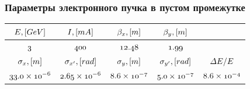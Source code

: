 \documentclass[14pt, hyperref = {colorlinks},xcolor=table ]{beamer}
\begin{document}
\begin{frame}
\frametitle{Параметры электронного пучка в пустом промежутке}\label{t1}
\begin{table}[h]
	
	\begin{tabular}{c|c|c|c|c}
		\hline
		\hline
		\rule{0pt}{3ex}   $\mathnormal{E, [GeV]}$ & $\mathnormal{I, [mA]}$ & $\mathnormal{\beta_x, [m]}$ & $\mathnormal{\beta_{y}, [m]}$&\\ \hline
		\rule{0pt}{3ex}   $\mathnormal{3}$		 & $\mathnormal{400}    $ & $\mathnormal{12.48}$        & $\mathnormal{1.99}$  &   \\ \hline
		\hline	
		\rule{0pt}{3ex}   $\mathnormal{\sigma_x, [m]}$ & $\mathnormal{\sigma_{x'}, [rad]}$ & $\mathnormal{\sigma_y, [m]}$     & $\mathnormal{\sigma_{y'}, [rad]}$ & $\mathnormal{\Delta E / E}$      \\ \hline
		\rule{0pt}{3ex}   $\mathnormal{33.0 \times 10^{-6}}$  & $\mathnormal{2.65 \times 10^{-6}}$  &  $\mathnormal{8.6 \times 10^{-7}}$ & $\mathnormal{5.0 \times 10^{-7}}$   & $\mathnormal{8.6 \times 10^{-4}}$ \\
		\hline\hline
	\end{tabular}
\end{table}
\end{frame}
\end{document}
